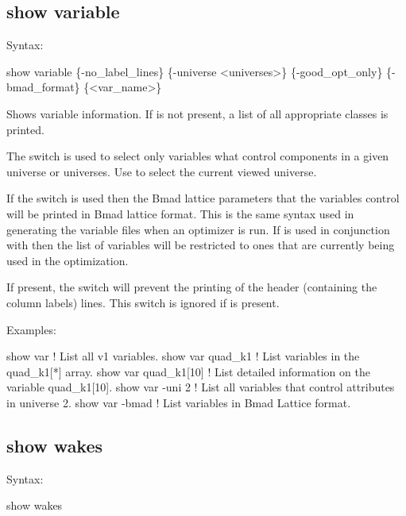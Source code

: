 {{{{{{{{{%

\subsection{show variable}
\label{s:show.variable}

Syntax:
\begin{example}
  show variable \{-no_label_lines\} \{-universe <universes>\}            
         \{-good_opt_only\} \{-bmad_format\} \{<var_name>\}
\end{example}


Shows variable information. If  is not present, a list of all appropriate
 classes is printed.

The  switch is used to select only variables what control components in a
given universe or universes. Use  to select the current viewed universe.

If the  switch is used then the Bmad lattice parameters that the \tao
variables control will be printed in Bmad lattice format. This is the same syntax used in
generating the variable files when an optimizer is run. If  is used in
conjunction with  then the list of variables will be restricted to ones
that are currently being used in the optimization.

If present, the  switch will prevent the printing of the header
(containing the column labels) lines. This switch is ignored if  is present.

Examples:
\begin{example}
  show var             ! List all v1 variables.
  show var quad_k1     ! List variables in the quad_k1[*] array.
  show var quad_k1[10] ! List detailed information on the variable quad_k1[10].
  show var -uni 2      ! List all variables that control attributes in universe 2.
  show var -bmad       ! List variables in Bmad Lattice format.
\end{example}


\subsection{show wakes}
\label{s:show.wakes}

Syntax:
\begin{example}
  show wakes 
\end{example}

}}}}}}}}}
